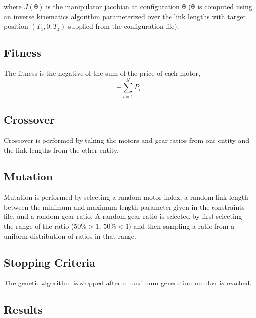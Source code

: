 \documentclass{article}
\begin{document}
where ${J(\bm{\theta})}$ is the manipulator jacobian at configuration
$\bm{\theta}$ ($\bm{\theta}$ is computed using an inverse kinematics algorithm
parameterized over the link lengths with target position $(T_x, 0, T_z)$
supplied from the configuration file).

\FloatBarrier{}
\subsection{Fitness}

The fitness is the negative of the sum of the price of each motor,
\begin{equation}
    -\sum_{i=1}^{N} P_i
\end{equation}

\FloatBarrier{}
\subsection{Crossover}

Crossover is performed by taking the motors and gear ratios from one entity and
the link lengths from the other entity.

\FloatBarrier{}
\subsection{Mutation}

Mutation is performed by selecting a random motor index, a random link length
between the minimum and maximum length parameter given in the constraints file,
and a random gear ratio. A random gear ratio is selected by first selecting the
range of the ratio ($50\% > 1$, $50\% < 1$) and then sampling a ratio from a
uniform distribution of ratios in that range.

\FloatBarrier{}
\subsection{Stopping Criteria}

The genetic algorithm is stopped after a maximum generation number is reached.

\FloatBarrier{}
\subsection{Results}
\end{document}
